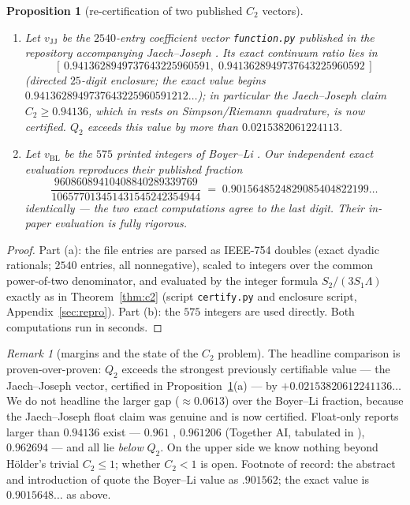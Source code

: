 \documentclass[11pt]{article}
\newtheorem{proposition}[theorem]{Proposition}
\theoremstyle{remark}
\newtheorem{remark}[theorem]{Remark}
\begin{document}
\begin{proposition}[re-certification of two published $C_2$ vectors]
\label{prop:c2recert}
\begin{enumerate}
\item[(a)] Let $v_{\mathrm{JJ}}$ be the $2540$-entry coefficient vector
\texttt{function.py} published in the repository accompanying Jaech--Joseph
\cite{JJ25}. Its exact continuum ratio lies in
\[
[\,0.9413628949737643225960591,\; 0.9413628949737643225960592\,]
\]
(directed $25$-digit enclosure; the exact value begins
$0.9413628949737643225960591212\ldots$); in particular the Jaech--Joseph claim
$C_2 \ge 0.94136$, which in \cite{JJ25} rests on Simpson/Riemann quadrature,
is now certified. $Q_2$ exceeds this value by more than
$0.0215382061224113$.
\item[(b)] Let $v_{\mathrm{BL}}$ be the $575$ printed integers of Boyer--Li
\cite{BoyerLi25}. Our independent exact evaluation reproduces their
published fraction
\[
\frac{96086089410408840289339769}{106577013451431545242354944}
\;=\; 0.9015648524829085404822199\ldots
\]
identically --- the two exact computations agree to the last digit. Their
in-paper evaluation is fully rigorous.
\end{enumerate}
\end{proposition}

\begin{proof}
Part (a): the file entries are parsed as IEEE-754 doubles (exact dyadic
rationals; $2540$ entries, all nonnegative), scaled to integers over the
common power-of-two denominator, and evaluated by the integer formula
$S_2/(3 S_1 \Lambda)$ exactly as in Theorem~\ref{thm:c2} (script
\texttt{certify.py} and enclosure script, Appendix~\ref{sec:repro}). Part
(b): the $575$ integers are used directly. Both computations run in
seconds.
\end{proof}

\begin{remark}[margins and the state of the $C_2$ problem]\label{rem:c2margins}
The headline comparison is proven-over-proven: $Q_2$ exceeds the strongest
previously certifiable value --- the Jaech--Joseph vector, certified in
Proposition~\ref{prop:c2recert}(a) --- by $+0.02153820612241136\ldots$
We do not headline the larger gap ($\approx 0.0613$) over the Boyer--Li
fraction, because the Jaech--Joseph float claim was genuine and is now
certified. Float-only reports larger than $0.94136$ exist ---
$0.961$ \cite{MathScale25}, $0.961206$ (Together AI, tabulated in
\cite{SimpleTES26}), $0.962694$ \cite{SimpleTES26} --- and all lie
\emph{below} $Q_2$. On the upper side we know nothing beyond H\"older's
trivial $C_2 \le 1$; whether $C_2 < 1$ is open. Footnote of record: the
abstract and introduction of \cite{JJ25} quote the Boyer--Li value as
$.901562$; the exact value is $0.9015648\ldots$ as above.
\end{remark}
\end{document}
